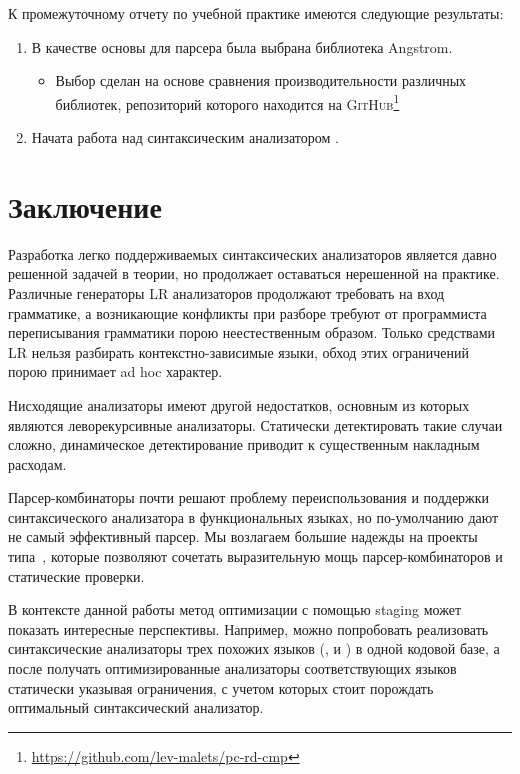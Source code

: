 
К промежуточному отчету по учебной практике имеются следующие результаты:

\begin{enumerate}
\item В качестве основы для парсера была выбрана библиотека Angstrom.
\begin{itemize}
\item Выбор сделан на основе сравнения производительности различных библиотек, репозиторий которого находится на \textsc{GitHub}\footnote{\url{https://github.com/lev-malets/pc-rd-cmp}}
\end{itemize}
\item Начата работа над синтаксическим анализатором \ReScript{}.
\end{enumerate}

\noindent

\section{Заключение}
Разработка легко поддерживаемых синтаксических анализаторов является давно решенной задачей в теории, но продолжает оставаться нерешенной на практике. Различные генераторы LR анализаторов продолжают требовать на вход грамматике, а возникающие конфликты при разборе требуют от программиста переписывания грамматики порою неестественным образом. 
Только средствами LR нельзя разбирать контекстно-зависимые языки, обход этих ограничений порою принимает ad hoc характер. 

Нисходящие анализаторы имеют другой недостатков, основным из которых являются леворекурсивные анализаторы. Статически детектировать такие случаи сложно, динамическое детектирование приводит к существенным накладным расходам. 

Парсер-комбинаторы почти решают проблему переиспользования и поддержки синтаксического анализатора в функциональных языках, но по-умолчанию дают не самый эффективный парсер. Мы возлагаем большие надежды на проекты типа~\cite{parsley2020}, которые позволяют сочетать выразительную мощь парсер-комбинаторов и статические проверки. 

В контексте данной работы метод оптимизации с помощью staging может показать интересные перспективы. Например, можно попробовать реализовать синтаксические анализаторы трех похожих языков (\OCaml{}, \ReasonML{} и \ReScript{}) в одной кодовой базе, а после получать оптимизированные анализаторы соответствующих языков статически указывая ограничения, с учетом которых стоит порождать оптимальный синтаксический анализатор.

